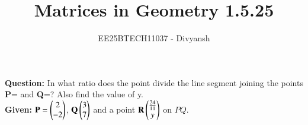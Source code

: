 \documentclass[journal,12pt,onecolumn]{IEEEtran}
\title{Matrices in Geometry 1.5.25}
\author{EE25BTECH11037 - Divyansh}
\theoremstyle{remark}
\begin{document}
\vspace{3cm}
\maketitle
{\let\newpage\relax\maketitle}
\textbf{Question: }
In what ratio does the point  divide the line segment joining the points \textbf{P}= and \textbf{Q}=? Also find the value of y.\\

\textbf{Given: } 
$\mathbf{P}=\begin{pmatrix}2\\-2\end{pmatrix}$, $\mathbf{Q}\begin{pmatrix}3\\7\end{pmatrix}$ and a point $\mathbf{R} \begin{pmatrix}\frac{24}{11} \\ y\end{pmatrix}$ on $PQ$.
\end{document}
